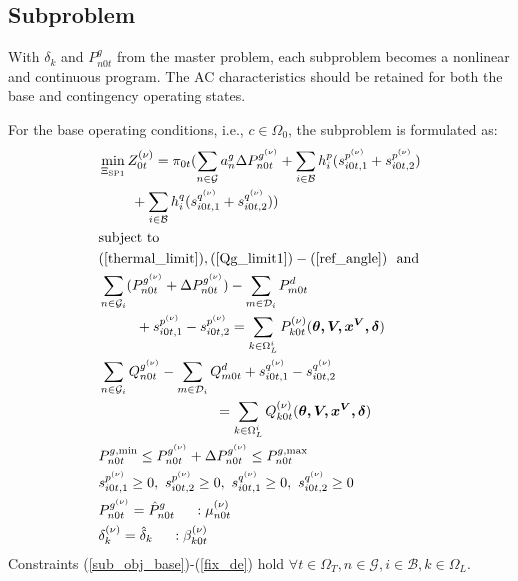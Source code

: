 \documentclass[journal]{IEEEtran}
\begin{document}
\subsection{Subproblem}
With $\delta_k$ and $P^g_{n0t}$ from the master problem, each subproblem becomes a nonlinear and continuous program. The AC characteristics should be retained for both the base and contingency operating states. 

For the base operating conditions, i.e., $c \in \Omega_0$, the subproblem is formulated as:
\begin{align}
&\min_{\Xi_{\text{SP1}}} Z_{0t}^{(\nu)}=\pi_{0t}(\sum_{n \in \mathcal{G}}{a^g_n \Delta P_{n0t}^{g^{(\nu)}}}+\sum_{i\in \mathcal{B}}h_i^p(s_{i0t,1}^{p^{(\nu)}}+s_{i0t,2}^{p^{(\nu)}}) \nonumber \\
&\ \ \ \ \ \ \ +\sum_{i\in \mathcal{B}}h_i^q(s_{i0t,1}^{q^{(\nu)}}+s_{i0t,2}^{q^{(\nu)}}))  \label{sub_obj_base}  \\
&\text{subject to}   \nonumber \\
&(\ref{thermal_limit}),(\ref{Qg_limit1})-(\ref{ref_angle}) \ \ \text{and} \nonumber \\  
&\sum_{n \in \mathcal{G}_i}(P^{g^{(\nu)}}_{n0t}+\Delta P^{g^{(\nu)}}_{n0t})-\sum_{m \in \mathcal{D}_i}P^d_{m0t}  \nonumber \\
&\ \ \ \ \ \ \ \ +s^{p^{(\nu)}}_{i0t,1}-s^{p^{(\nu)}}_{i0t,2}=\sum_{k\in \Omega_{L}^i } P^{(\nu)}_{k0t}(\bm{\theta,V,x^V,\delta}) \label{p_bal_sp1}  \\
&\sum_{n \in \mathcal{G}_i}Q^{g^{(\nu)}}_{n0t}-\sum_{m \in \mathcal{D}_i}Q^d_{m0t}+s^{q^{(\nu)}}_{i0t,1}-s^{q^{(\nu)}}_{i0t,2} \nonumber \\
&\ \ \ \ \ \ \ \ \ \ \ \ \ \ \ \ \ \ \ \ \ \ \ \ \  =\sum_{k\in \Omega_{L}^i } Q^{(\nu)}_{k0t}(\bm{\theta,V,x^V,\delta}) \label{q_bal_sp1}  \\
&P^{g,\min}_{n0t}\le P^{g^{(\nu)}}_{n0t}+\Delta P^{g^{(\nu)}}_{n0t} \le P^{g,\max}_{n0t}  \label{pg_limit_base}  \\
&s_{i0t,1}^{p^{(\nu)}} \ge 0, \ s_{i0t,2}^{p^{(\nu)}} \ge 0,\ s_{i0t,1}^{q^{(\nu)}} \ge 0, \ s_{i0t,2}^{q^{(\nu)}} \ge 0    \label{slack_range}   \\
&P^{g^{(\nu)}}_{n0t}=\hat{P}^g_{n0t} \ \ \ \ : \mu_{n0t}^{(\nu)}   \label{fix_P} \\
&\delta_k^{(\nu)}=\hat{\delta}_k \ \ \ \ : \beta_{k0t}^{(\nu)}     \label{fix_de} 
\end{align} 
Constraints (\ref{sub_obj_base})-(\ref{fix_de}) hold $\forall t \in \Omega_T, n\in \mathcal{G}, i\in \mathcal{B}, k \in \Omega_L$.
\end{document}

